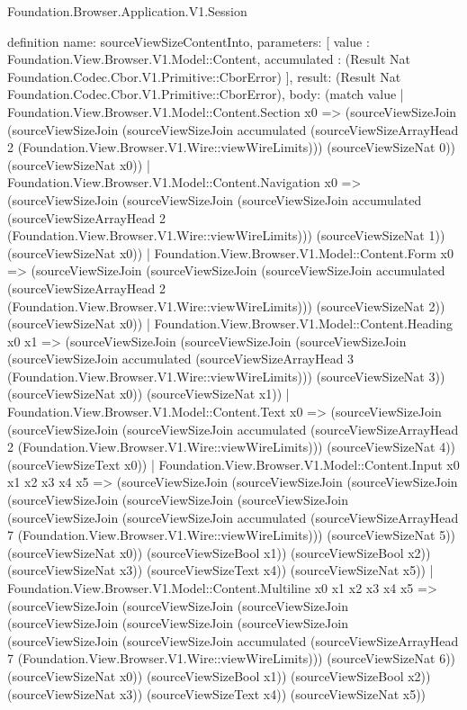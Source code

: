 \begin{lexlean}{Foundation.Browser.Application.V1.Session}
\begin{semanticmodule}
definition{
  name: sourceViewSizeContentInto,
  parameters: [
    value : Foundation.View.Browser.V1.Model::Content,
    accumulated : (Result Nat Foundation.Codec.Cbor.V1.Primitive::CborError)
  ],
  result: (Result Nat Foundation.Codec.Cbor.V1.Primitive::CborError),
  body: (match value
    | Foundation.View.Browser.V1.Model::Content.Section x0 => (sourceViewSizeJoin (sourceViewSizeJoin (sourceViewSizeJoin accumulated (sourceViewSizeArrayHead 2 (Foundation.View.Browser.V1.Wire::viewWireLimits))) (sourceViewSizeNat 0)) (sourceViewSizeNat x0))
    | Foundation.View.Browser.V1.Model::Content.Navigation x0 => (sourceViewSizeJoin (sourceViewSizeJoin (sourceViewSizeJoin accumulated (sourceViewSizeArrayHead 2 (Foundation.View.Browser.V1.Wire::viewWireLimits))) (sourceViewSizeNat 1)) (sourceViewSizeNat x0))
    | Foundation.View.Browser.V1.Model::Content.Form x0 => (sourceViewSizeJoin (sourceViewSizeJoin (sourceViewSizeJoin accumulated (sourceViewSizeArrayHead 2 (Foundation.View.Browser.V1.Wire::viewWireLimits))) (sourceViewSizeNat 2)) (sourceViewSizeNat x0))
    | Foundation.View.Browser.V1.Model::Content.Heading x0 x1 => (sourceViewSizeJoin (sourceViewSizeJoin (sourceViewSizeJoin (sourceViewSizeJoin accumulated (sourceViewSizeArrayHead 3 (Foundation.View.Browser.V1.Wire::viewWireLimits))) (sourceViewSizeNat 3)) (sourceViewSizeNat x0)) (sourceViewSizeNat x1))
    | Foundation.View.Browser.V1.Model::Content.Text x0 => (sourceViewSizeJoin (sourceViewSizeJoin (sourceViewSizeJoin accumulated (sourceViewSizeArrayHead 2 (Foundation.View.Browser.V1.Wire::viewWireLimits))) (sourceViewSizeNat 4)) (sourceViewSizeText x0))
    | Foundation.View.Browser.V1.Model::Content.Input x0 x1 x2 x3 x4 x5 => (sourceViewSizeJoin (sourceViewSizeJoin (sourceViewSizeJoin (sourceViewSizeJoin (sourceViewSizeJoin (sourceViewSizeJoin (sourceViewSizeJoin (sourceViewSizeJoin accumulated (sourceViewSizeArrayHead 7 (Foundation.View.Browser.V1.Wire::viewWireLimits))) (sourceViewSizeNat 5)) (sourceViewSizeNat x0)) (sourceViewSizeBool x1)) (sourceViewSizeBool x2)) (sourceViewSizeNat x3)) (sourceViewSizeText x4)) (sourceViewSizeNat x5))
    | Foundation.View.Browser.V1.Model::Content.Multiline x0 x1 x2 x3 x4 x5 => (sourceViewSizeJoin (sourceViewSizeJoin (sourceViewSizeJoin (sourceViewSizeJoin (sourceViewSizeJoin (sourceViewSizeJoin (sourceViewSizeJoin (sourceViewSizeJoin accumulated (sourceViewSizeArrayHead 7 (Foundation.View.Browser.V1.Wire::viewWireLimits))) (sourceViewSizeNat 6)) (sourceViewSizeNat x0)) (sourceViewSizeBool x1)) (sourceViewSizeBool x2)) (sourceViewSizeNat x3)) (sourceViewSizeText x4)) (sourceViewSizeNat x5))
}
\end{semanticmodule}
\end{lexlean}
